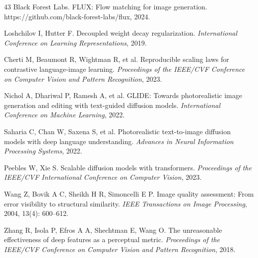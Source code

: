 \documentclass[times,twocolumn,final]{elsarticle}
\begin{document}
\begin{thebibliography}{43}
Black Forest Labs. FLUX: Flow matching for image generation. https://github.com/black-forest-labs/flux, 2024.

Loshchilov I, Hutter F. Decoupled weight decay regularization. \textit{International Conference on Learning Representations}, 2019.

Cherti M, Beaumont R, Wightman R, et al. Reproducible scaling laws for contrastive language-image learning. \textit{Proceedings of the IEEE/CVF Conference on Computer Vision and Pattern Recognition}, 2023.

Nichol A, Dhariwal P, Ramesh A, et al. GLIDE: Towards photorealistic image generation and editing with text-guided diffusion models. \textit{International Conference on Machine Learning}, 2022.

Saharia C, Chan W, Saxena S, et al. Photorealistic text-to-image diffusion models with deep language understanding. \textit{Advances in Neural Information Processing Systems}, 2022.

Peebles W, Xie S. Scalable diffusion models with transformers. \textit{Proceedings of the IEEE/CVF International Conference on Computer Vision}, 2023.

Wang Z, Bovik A C, Sheikh H R, Simoncelli E P. Image quality assessment: From error visibility to structural similarity. \textit{IEEE Transactions on Image Processing}, 2004, 13(4): 600--612.

Zhang R, Isola P, Efros A A, Shechtman E, Wang O. The unreasonable effectiveness of deep features as a perceptual metric. \textit{Proceedings of the IEEE/CVF Conference on Computer Vision and Pattern Recognition}, 2018.

\end{thebibliography}
\end{document}
